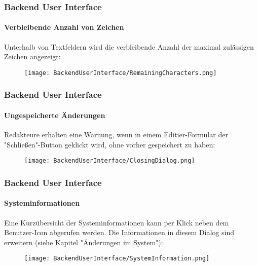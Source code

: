 \begin{frame}[fragile]
	\frametitle{Backend User Interface}
	\framesubtitle{Verbleibende Anzahl von Zeichen}

	Unterhalb von Textfeldern wird die verbleibende Anzahl der maximal zulässigen
	Zeichen angezeigt:

	\begin{figure}
		\texttt{[image: BackendUserInterface/RemainingCharacters.png]}
	\end{figure}

\end{frame}

\begin{frame}[fragile]
	\frametitle{Backend User Interface}
	\framesubtitle{Ungespeicherte Änderungen}

	Redakteure erhalten eine Warnung, wenn in einem Editier-Formular der "Schließen"-Button
	geklickt wird, ohne vorher gespeichert zu haben:

	\begin{figure}
		\texttt{[image: BackendUserInterface/ClosingDialog.png]}
	\end{figure}

\end{frame}

\begin{frame}[fragile]
	\frametitle{Backend User Interface}
	\framesubtitle{Systeminformationen}

	Eine Kurzübersicht der Systeminformationen kann per Klick neben dem Benutzer-Icon
	abgerufen werden. Die Informationen in diesem Dialog sind erweitern (siehe Kapitel
	"Änderungen im System"):

	\begin{figure}
		\texttt{[image: BackendUserInterface/SystemInformation.png]}
	\end{figure}

\end{frame}

